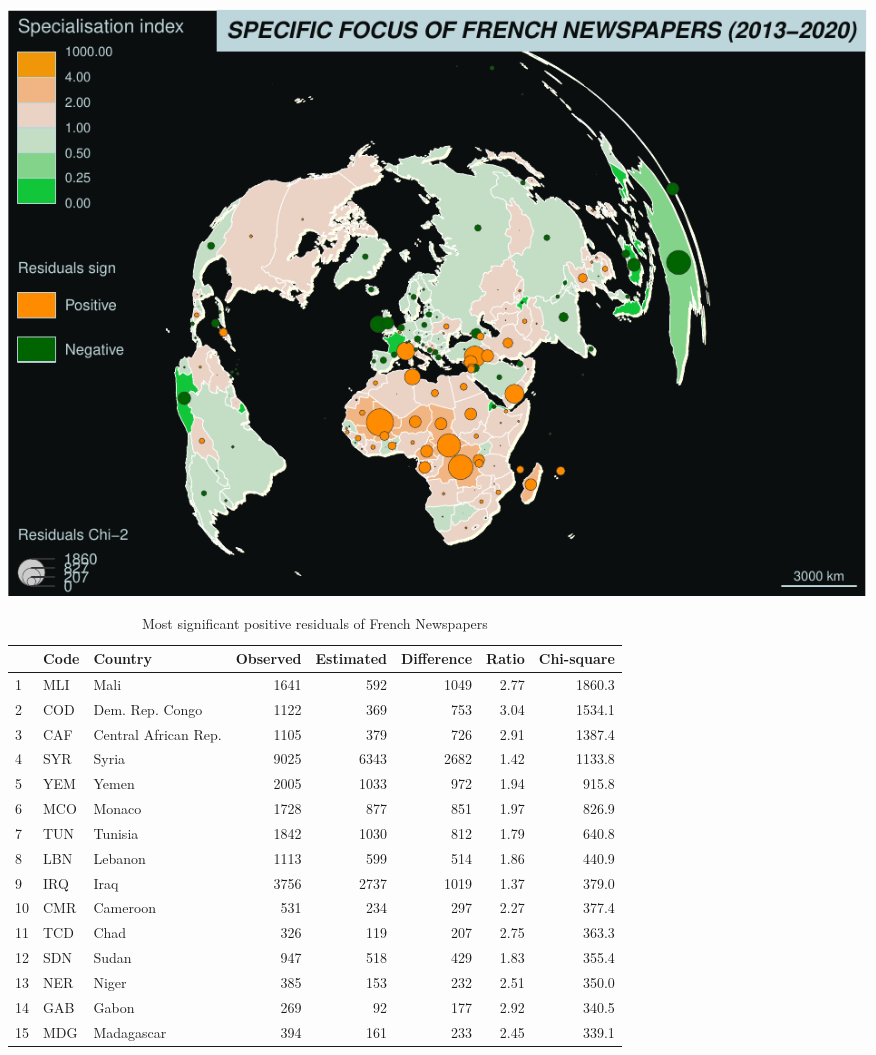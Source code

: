 \documentclass[
]{article}
\begin{document}
\includegraphics{Part2_maps_files/figure-latex/unnamed-chunk-15-1.pdf}

\begin{table}

\caption{\label{tab:unnamed-chunk-16}Most significant positive residuals of French Newspapers}
\centering
\begin{tabular}[t]{l|l|l|r|r|r|r|r}
\hline
  & Code & Country & Observed & Estimated & Difference & Ratio & Chi-square\\
\hline
1 & MLI & Mali & 1641 & 592 & 1049 & 2.77 & 1860.3\\
\hline
2 & COD & Dem. Rep. Congo & 1122 & 369 & 753 & 3.04 & 1534.1\\
\hline
3 & CAF & Central African Rep. & 1105 & 379 & 726 & 2.91 & 1387.4\\
\hline
4 & SYR & Syria & 9025 & 6343 & 2682 & 1.42 & 1133.8\\
\hline
5 & YEM & Yemen & 2005 & 1033 & 972 & 1.94 & 915.8\\
\hline
6 & MCO & Monaco & 1728 & 877 & 851 & 1.97 & 826.9\\
\hline
7 & TUN & Tunisia & 1842 & 1030 & 812 & 1.79 & 640.8\\
\hline
8 & LBN & Lebanon & 1113 & 599 & 514 & 1.86 & 440.9\\
\hline
9 & IRQ & Iraq & 3756 & 2737 & 1019 & 1.37 & 379.0\\
\hline
10 & CMR & Cameroon & 531 & 234 & 297 & 2.27 & 377.4\\
\hline
11 & TCD & Chad & 326 & 119 & 207 & 2.75 & 363.3\\
\hline
12 & SDN & Sudan & 947 & 518 & 429 & 1.83 & 355.4\\
\hline
13 & NER & Niger & 385 & 153 & 232 & 2.51 & 350.0\\
\hline
14 & GAB & Gabon & 269 & 92 & 177 & 2.92 & 340.5\\
\hline
15 & MDG & Madagascar & 394 & 161 & 233 & 2.45 & 339.1\\
\hline
\end{tabular}
\end{table}
\end{document}

